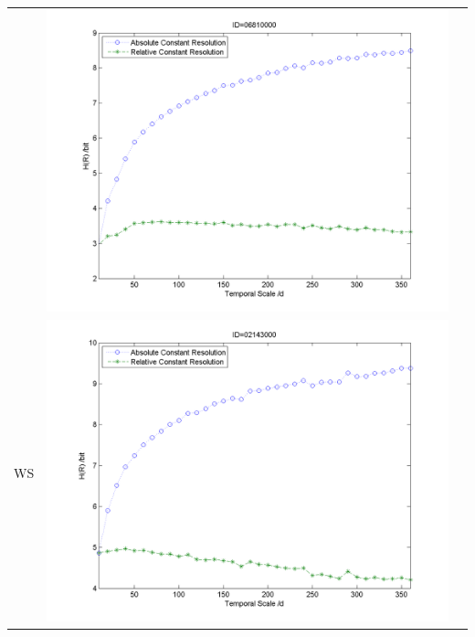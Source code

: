 \documentclass[11pt]{article}
\begin{document}
\begin{table}[H]
{\begin{tabular}{ccc}
&\begin{minipage}{.6\textwidth}\includegraphics[width=\linewidth]{resultgraph/e06810000.png}\end{minipage}
\\
WS
&\begin{minipage}{.6\textwidth}\includegraphics[width=\linewidth]{resultgraph/e02143000.png}\end{minipage}
 

\end{tabular}}
\end{table}
\end{document}
